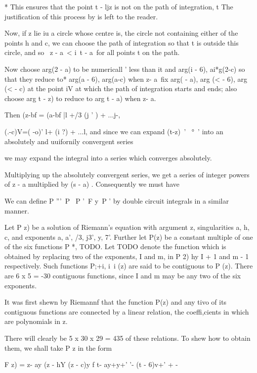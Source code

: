* This ensures that the point t - ljz is not on the path of
integration, t The justification of this process by is left to
the reader.

%
%

Now, if z lie iu a circle whose centre is, the circle not containing
either of the points h and c, we can choose the path of integration so
that t is outside this circle, and so \ z - a\ < i\ t - a\ for all
points t on the path.

Now choose arg(2 - a) to be numericall ' less than it and arg(i - 6),
ai*g(2-c) so that they reduce to* arg(a - 6), arg(a-c) when z- a\ fix
arg( - a), arg (< - 6), arg (< - c) at the point iV at which the path
of integration starts and ends; also choose arg t - z) to reduce to
arg t - a) when z- a.

Then (z-bf = (a-bf |l +/3 (j ' ) + ...j-,

(.-c)V=( -o)' l+ (i ?) + ...l, and since we can expand (t-z)~' ~°~'
into an absolutely and uuifornily convergent series

we may expand the integral into a series which converges absolutely.

Multiplying up the absolutely convergent series, we get a series of
integer powers of z - a multiplied by (s - a) . Consequently we must
have

We can define P '''\ P \ P '\ F y\ P ' by double circuit integrals in
a similar manner.


Let P z) be a solution of Riemann's equation with argument z,
singularities a, h, c, and exponents a, a', /3, j3', y, 7'. Further
let P(z) be a constant multiple of one of the six functions P *,
TODO.
Let TODO denote the function
which is obtained by replacing two of the exponents, I and m, in P 2)
hy I + 1 and m - 1 respectively. Such functions P;+i, i\ i (z) are
said to be contiguous to P (z). There are 6 x 5 = -30 contiguous
functions, since I and m may be any two of the six exponents.

It was first shewn by Riemannf that the function P(z) and any tivo of
its contiguous functions are connected by a linear relation, the
coeffi,cients in which are polynomials in z.

There will clearly be 5 x 30 x 29 = 435 of these relations. To shew
how to obtain them, we shall take P z in the form

F z) = z- ay (z - hY (z - c)y f t- ay+y+' '- (t - 6)v+' + -

